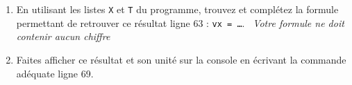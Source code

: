 \documentclass[11pt]{article}
\begin{document}
\begin{enumerate}
 
 \medskip
 
 \item \app \com En utilisant les listes \texttt{X} et \texttt{T} du programme, trouvez et complétez la formule permettant de retrouver ce résultat ligne 63 : \texttt{vx = \ldots}. \hspace{1cm}\danger\ \textsl{Votre formule ne doit contenir aucun chiffre} \danger\hspace{1cm}\cpdepce

 
 
 
 
 
 \medskip
 
 \item \rea Faites afficher ce résultat et son unité sur la console en écrivant la commande adéquate ligne 69. 
 
 
 
 
 
\end{enumerate}


\bigskip

\grilleDS
































\end{document}
